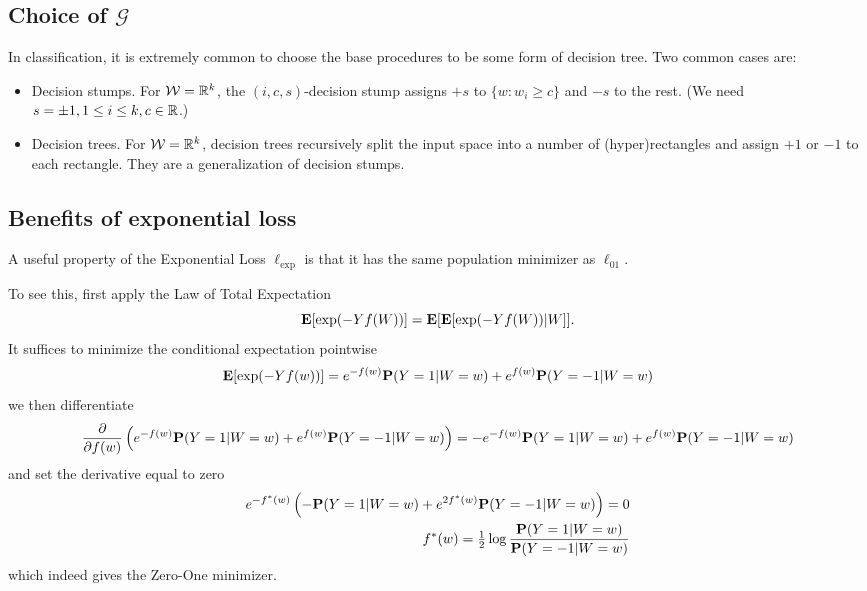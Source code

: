 \subsection{Choice of $\mathcal{G}$}
In classification, it is extremely common to choose the base procedures to be some form of decision tree. Two common cases are:
\begin{itemize}
	\item Decision stumps. For $\mathcal{W} = \mathbb{R}^k$, the $(i, c, s)$-decision stump assigns $+s$ to $\{w : w_i \ge c\}$ and $-s$ to the rest. (We need $s=\pm 1, 1 \le i \le k, c \in \mathbb{R}$.)
	\item Decision trees. For $\mathcal{W} = \mathbb{R}^k$, decision trees recursively split the input space into a number of (hyper)rectangles and assign $+1$ or $-1$ to each rectangle. They are a generalization of decision stumps.
\end{itemize}

\subsection{Benefits of exponential loss}
A useful property of the Exponential Loss $\ell_\text{exp}$ is that it has the same population minimizer as $\ell_{01}$.

To see this, first apply the Law of Total Expectation
\begin{equation*}
	\mathbf{E}[\exp(-Yf(W))] = \mathbf{E}[\mathbf{E}[\exp(-Yf(W))|W]].
\end{equation*}
It suffices to minimize the conditional expectation pointwise
\begin{equation*}
	\mathbf{E}[\exp(-Yf(w))] = e^{-f(w)}\mathbf{P}(Y=1|W=w) + e^{f(w)}\mathbf{P}(Y=-1|W=w)
\end{equation*}
we then differentiate
\begin{equation*}
	\frac{\partial}{\partial f(w)} \left( e^{-f(w)}\mathbf{P}(Y=1|W=w) + e^{f(w)}\mathbf{P}(Y=-1|W=w) \right) = -e^{-f(w)}\mathbf{P}(Y=1|W=w) + e^{f(w)}\mathbf{P}(Y=-1|W=w)
\end{equation*}
and set the derivative equal to zero
\begin{align*}
	e^{-f^*(w)} \left( -\mathbf{P}(Y=1|W=w) + e^{2f^*(w)}\mathbf{P}(Y=-1|W=w) \right) = 0 \\
	f^*(w) = \tfrac{1}{2}\log \frac{\mathbf{P}(Y=1|W=w)}{\mathbf{P}(Y=-1|W=w)}
\end{align*}
which indeed gives the Zero-One minimizer.

